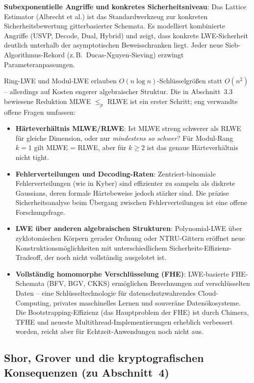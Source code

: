 ﻿\documentclass[a4paper,12pt]{article}
\theoremstyle{definition}
\begin{document}
\textbf{Subexponentielle Angriffe und konkretes Sicherheitsniveau}:
Das Lattice Estimator (Albrecht et al.) ist das Standardwerkzeug zur
konkreten Sicherheitsbewertung gitterbasierter Schemata. Es modelliert
kombinierte Angriffe (USVP, Decode, Dual, Hybrid) und zeigt, dass
konkrete LWE-Sicherheit deutlich unterhalb der asymptotischen
Beweisschranken liegt. Jeder neue Sieb-Algorithmus-Rekord
(z.\,B.\ Ducas-Nguyen-Sieving) erzwingt Parameteranpassungen.

Ring-LWE und Modul-LWE erlauben $O(n \log n)$-Schlüsselgrößen
statt $O(n^2)$ -- allerdings auf Kosten engerer algebraischer Struktur.
Die in Abschnitt~3.3 bewiesene Reduktion MLWE $\leq_p$ RLWE ist ein
erster Schritt; eng verwandte offene Fragen umfassen:

\begin{itemize}
  \item \textbf{Härteverhältnis MLWE/RLWE}: Ist MLWE streng schwerer
    als RLWE für gleiche Dimension, oder nur \emph{mindestens so schwer}?
    Für Modul-Rang $k=1$ gilt MLWE = RLWE, aber für $k \geq 2$ ist
    das genaue Härteverhältnis nicht tight.
  \item \textbf{Fehlerverteilungen und Decoding-Raten}: Zentriert-binomiale
    Fehlerverteilungen (wie in Kyber) sind effizienter zu sampeln als
    diskrete Gaussians, deren formale Härtebeweise jedoch stärker sind.
    Die präzise Sicherheitsanalyse beim Übergang zwischen
    Fehlerverteilungen ist eine offene Forschungsfrage.
  \item \textbf{LWE über anderen algebraischen Strukturen}: Polynomial-LWE
    über zyklotomischen Körpern gerader Ordnung oder NTRU-Gittern
    eröffnet neue Konstruktionsmöglichkeiten mit unterschiedlichem
    Sicherheits-Effizienz-Tradeoff, der noch nicht vollständig
    ausgelotet ist.
  \item \textbf{Vollständig homomorphe Verschlüsselung (FHE)}: LWE-basierte
    FHE-Schemata (BFV, BGV, CKKS) ermöglichen Berechnungen auf
    verschlüsselten Daten -- eine Schlüsseltechnologie für
    datenschutzwahrendes Cloud-Computing, privates maschinelles Lernen
    und souveräne Datenökosysteme. Die Bootstrapping-Effizienz (das
    Hauptproblem der FHE) ist durch Chimera, TFHE und neueste
    Multithread-Implementierungen erheblich verbessert worden,
    reicht aber für Echtzeit-Anwendungen noch nicht aus.
\end{itemize}

\subsection{Shor, Grover und die kryptografischen Konsequenzen (zu Abschnitt~4)}
\end{document}

